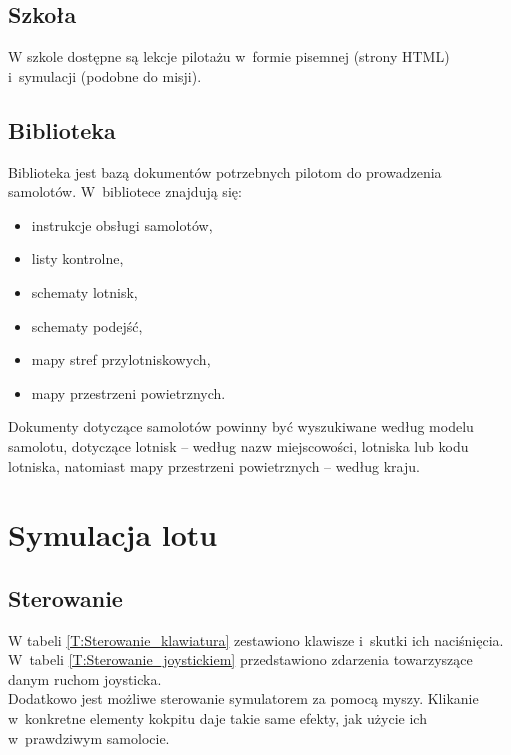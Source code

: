 \documentclass{mwrep}
\begin{document}
\subsection{Szkoła}
W szkole dostępne są lekcje pilotażu w~formie pisemnej (strony HTML) i~symulacji (podobne do misji).

\subsection{Biblioteka}
Biblioteka jest bazą dokumentów potrzebnych pilotom do prowadzenia samolotów. W~bibliotece znajdują się:
\begin{itemize}
\item instrukcje obsługi samolotów,
\item listy kontrolne,
\item schematy lotnisk,
\item schematy podejść,
\item mapy stref przylotniskowych,
\item mapy przestrzeni powietrznych.
\end{itemize}

Dokumenty dotyczące samolotów powinny być wyszukiwane według modelu samolotu, dotyczące lotnisk -- według nazw miejscowości, lotniska lub kodu lotniska, natomiast mapy przestrzeni powietrznych -- według kraju.

\section{Symulacja lotu}

\subsection{Sterowanie}

W tabeli \ref{T:Sterowanie_klawiatura} zestawiono klawisze i~skutki ich naciśnięcia. W~tabeli \ref{T:Sterowanie_joystickiem} przedstawiono zdarzenia towarzyszące danym ruchom joysticka.\\
Dodatkowo jest możliwe sterowanie symulatorem za pomocą myszy. Klikanie w~konkretne elementy kokpitu daje takie same efekty, jak użycie ich w~prawdziwym samolocie.
\end{document}
